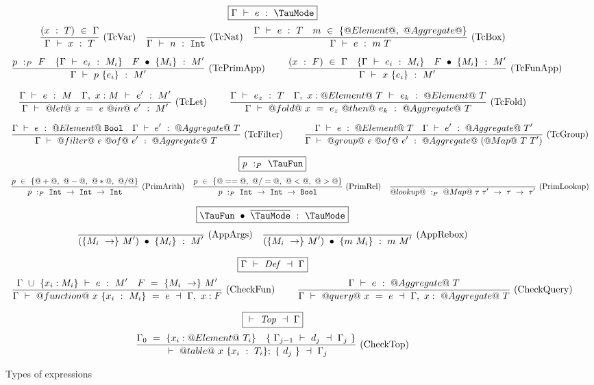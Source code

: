 
\begin{figure*}

$$
\boxed{\Typecheck{\Gamma}{e}{\TauMode}}
$$
$$
\enskip \frac {\displaystyle 
    (x~:~T)~\in~\Gamma
} {\displaystyle  
    \Gamma ~\vdash~ x~:~T
} \  \mbox{(TcVar)} \enskip
\enskip \frac {\displaystyle 
} {\displaystyle  
    \Gamma ~\vdash~ n~:~\mathtt{Int}
} \  \mbox{(TcNat)} \enskip
\enskip \frac {\displaystyle 
  \Gamma ~\vdash~ e~:~T
  \quad
  m~\in~\{@Element@,~@Aggregate@\}
} {\displaystyle  
    \Gamma ~\vdash~ e~:~m~T
} \  \mbox{(TcBox)} \enskip
$$

$$
\enskip \frac {\displaystyle 
    p~:_P~F
    \quad
    \{ \Gamma ~\vdash~ e_i~:~M_i \}
    \quad
    F~\bullet~\{M_i\}~:~M'
} {\displaystyle  
    \Gamma ~\vdash~ p~\{e_i\}~:~M'
} \  \mbox{(TcPrimApp)} \enskip~~~~
\enskip \frac {\displaystyle 
    (x~:~F)~\in~\Gamma
    \quad
    \{ \Gamma ~\vdash~ e_i~:~M_i \}
    \quad
    F~\bullet~\{M_i\}~:~M'
} {\displaystyle  
    \Gamma ~\vdash~ x~\{e_i\}~:~M'
} \  \mbox{(TcFunApp)} \enskip
$$

$$
\enskip \frac {\displaystyle 
  \Gamma ~\vdash~ e~:~M
  \quad
  \Gamma,~x:M ~\vdash~ e'~:~M'
} {\displaystyle 
  \Gamma ~\vdash~ @let@~x~=~e~@in@~e'~:~M'
} \  \mbox{(TcLet)} \enskip~~~~
\enskip \frac {\displaystyle 
  \Gamma ~\vdash~ e_z~:~T
  \quad
  \Gamma,~x:@Element@~T ~\vdash~ e_k~:~@Element@~T
} {\displaystyle 
  \Gamma ~\vdash~ @fold@~x~=~e_z~@then@~e_k~:~@Aggregate@~T
} \  \mbox{(TcFold)} \enskip
$$

$$
\enskip \frac {\displaystyle 
  \Gamma ~\vdash~ e~:~@Element@~\mathtt{Bool}
  \quad
  \Gamma ~\vdash~ e'~:~@Aggregate@~T
} {\displaystyle 
  \Gamma ~\vdash~ @filter@~e~@of@~e'~:~@Aggregate@~T
} \  \mbox{(TcFilter)} \enskip~~~~
\enskip \frac {\displaystyle 
  \Gamma ~\vdash~ e~:~@Element@~T
  \quad
  \Gamma ~\vdash~ e'~:~@Aggregate@~T'
} {\displaystyle 
  \Gamma ~\vdash~ @group@~e~@of@~e'~:~@Aggregate@~(@Map@~T~T')
} \  \mbox{(TcGroup)} \enskip
$$


$$
\boxed{\TypecheckP{\mi{p}}{\TauFun}}
$$
$$
\enskip \frac {\displaystyle 
  p~\in~\{@+@,~@-@,~@*@,~@/@\}
} {\displaystyle 
  p~:_P~\mathtt{Int}~\to~\mathtt{Int}~\to~\mathtt{Int}
} \  \mbox{(PrimArith)} \enskip
\enskip \frac {\displaystyle 
  p~\in~\{@==@,~@/=@,~@<@,~@>@\}
} {\displaystyle 
  p~:_P~\mathtt{Int}~\to~\mathtt{Int}~\to~\mathtt{Bool}
} \  \mbox{(PrimRel)} \enskip
\enskip \frac {\displaystyle } {\displaystyle 
  @lookup@~:_P~@Map@~\tau~\tau'~\to~\tau~\to~\tau'
} \  \mbox{(PrimLookup)} \enskip
$$


$$
\boxed{\TypecheckApp{\TauFun}{\ov{\TauMode}}{\TauMode}}
$$
$$
\enskip \frac {\displaystyle 
} {\displaystyle 
  (\{M_i~\to\}~M')~\bullet~\{M_i\}~:~M'
} \  \mbox{(AppArgs)} \enskip
\enskip \frac {\displaystyle 
} {\displaystyle 
  (\{M_i~\to\}~M')~\bullet~\{m~M_i\}~:~m~M'
} \  \mbox{(AppRebox)} \enskip
$$


$$
\boxed{\TypecheckS{\Gamma}{\mi{Def}}{\Gamma}}
$$
$$
\ruleIN
{
  \Typecheck{\Gamma~\cup~\{x_i:M_i\}}{e}{M'}
  \quad
  F~=~\{M_i~\to\}~M'
}
{
  \TypecheckS{\Gamma}{@function@~x~\{x_i~:~M_i\}~=~e}{\Gamma,~x:F}
}{CheckFun}~~~~
\ruleIN
{
  \Typecheck{\Gamma}{e}{@Aggregate@~T}
}
{
  \TypecheckS{\Gamma}{@query@~x~=~e}{\Gamma,~x:~@Aggregate@~T}
}{CheckQuery}
$$


$$
\boxed{\TypecheckS{}{\mi{Top}}{\Gamma}}
$$
$$
\ruleIN
{
  \Gamma_0~=~\{x_i:@Element@~T_i\}
  \quad
  \{~\TypecheckS{\Gamma_{j-1}}{d_j}{\Gamma_j}~\}
}
{
  \TypecheckS
    {}
    {
      @table@
      ~x~\{x_i~:~T_i\};
      ~\{~d_j~\}
    }
    {\Gamma_j}
}{CheckTop}
$$


\caption{Types of expressions}
\label{fig:source:type:exp}
\end{figure*}


